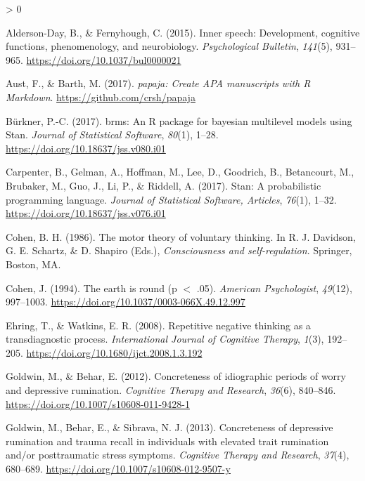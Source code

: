 \documentclass[
  english,
  man, donotrepeattitle,floatsintext]{apa6}
\newlength{\cslhangindent}
\newenvironment{CSLReferences}[2] %
 {%
  \setlength{\parindent}{0pt}
  \ifodd #1 \everypar{\setlength{\hangindent}{\cslhangindent}}\ignorespaces\fi
  \ifnum #2 > 0
  \setlength{\parskip}{#2\baselineskip}
  \fi
 }%
 {}
\begin{document}
\hypertarget{refs}{}
\begin{CSLReferences}{1}{0}
\leavevmode\hypertarget{ref-alderson-day_inner_2015}{}%
Alderson-Day, B., \& Fernyhough, C. (2015). Inner speech: {Development}, cognitive functions, phenomenology, and neurobiology. \emph{Psychological Bulletin}, \emph{141}(5), 931--965. \url{https://doi.org/10.1037/bul0000021}

\leavevmode\hypertarget{ref-R-papaja}{}%
Aust, F., \& Barth, M. (2017). \emph{{papaja}: {Create} {APA} manuscripts with {R Markdown}}. \url{https://github.com/crsh/papaja}

\leavevmode\hypertarget{ref-R-brms}{}%
Bürkner, P.-C. (2017). {brms}: An {R} package for bayesian multilevel models using {Stan}. \emph{Journal of Statistical Software}, \emph{80}(1), 1--28. \url{https://doi.org/10.18637/jss.v080.i01}

\leavevmode\hypertarget{ref-carpenter_stan_2017}{}%
Carpenter, B., Gelman, A., Hoffman, M., Lee, D., Goodrich, B., Betancourt, M., Brubaker, M., Guo, J., Li, P., \& Riddell, A. (2017). Stan: {A} probabilistic programming language. \emph{Journal of Statistical Software, Articles}, \emph{76}(1), 1--32. \url{https://doi.org/10.18637/jss.v076.i01}

\leavevmode\hypertarget{ref-cohen_motor_1986}{}%
Cohen, B. H. (1986). The motor theory of voluntary thinking. In R. J. Davidson, G. E. Schartz, \& D. Shapiro (Eds.), \emph{Consciousness and self-regulation}. {Springer, Boston, MA}.

\leavevmode\hypertarget{ref-cohen_earth_1994}{}%
Cohen, J. (1994). The earth is round (p {\(<\)} .05). \emph{American Psychologist}, \emph{49}(12), 997--1003. \url{https://doi.org/10.1037/0003-066X.49.12.997}

\leavevmode\hypertarget{ref-ehring_repetitive_2008}{}%
Ehring, T., \& Watkins, E. R. (2008). Repetitive negative thinking as a transdiagnostic process. \emph{International Journal of Cognitive Therapy}, \emph{1}(3), 192--205. \url{https://doi.org/10.1680/ijct.2008.1.3.192}

\leavevmode\hypertarget{ref-goldwin_concreteness_2012}{}%
Goldwin, M., \& Behar, E. (2012). Concreteness of idiographic periods of worry and depressive rumination. \emph{Cognitive Therapy and Research}, \emph{36}(6), 840--846. \url{https://doi.org/10.1007/s10608-011-9428-1}

\leavevmode\hypertarget{ref-goldwin_concreteness_2013}{}%
Goldwin, M., Behar, E., \& Sibrava, N. J. (2013). Concreteness of depressive rumination and trauma recall in individuals with elevated trait rumination and/or posttraumatic stress symptoms. \emph{Cognitive Therapy and Research}, \emph{37}(4), 680--689. \url{https://doi.org/10.1007/s10608-012-9507-y}


\end{CSLReferences}
\end{document}
